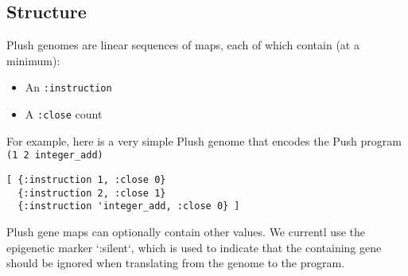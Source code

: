 
\subsection{Structure}
Plush genomes are linear sequences of maps, each of which contain (at a minimum):

\begin{itemize}
  \item An \texttt{:instruction}
  \item A \texttt{:close} count
\end{itemize}

For example, here is a very simple Plush genome that encodes the Push program \texttt{(1 2 integer\_add)}

\begin{lstlisting}
[ {:instruction 1, :close 0}
  {:instruction 2, :close 1}
  {:instruction 'integer_add, :close 0} ]
\end{lstlisting}

Plush gene maps can optionally contain other values. We currentl use the
epigenetic marker `:silent`,
which is used to indicate that the containing gene should be ignored when
translating from the genome to the program.

